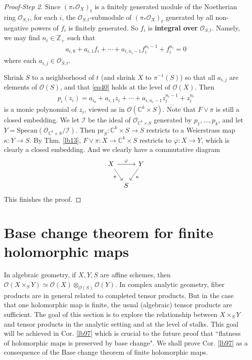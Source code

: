 \documentclass[12pt,b5paper,notitlepage]{report}
\theoremstyle{definition}
\theoremstyle{plain}
\newcommand{\mc}{\mathcal}
\newcommand{\scr}{\mathscr}
\newcommand{\Cbb}{\mathbb C}
\newcommand{\Zbb}{\mathbb Z}
\newcommand{\pr}{\mathrm {pr}}
\newcommand{\Specan}{\mathrm{Specan}}
\numberwithin{equation}{section}
\begin{document}
\begin{proof}[Proof-Step 2]
Since $(\pi_*\scr O_X)_t$ is a finitely generated module of the Noetherian ring $\scr O_{S,t}$, for each $i$, the $\scr O_{S,t}$-submodule of $(\pi_*\scr O_X)_t$ generated by all non-negative powers of $f_i$ is finitely generated. So $f_i$ is \textbf{integral over} $\scr O_{S,t}$.  Namely, we may find $n_i\in\Zbb_+$ such that
\begin{align}
a_{i,0}+a_{i,1}f_i+\cdots+a_{i,n_i-1}f_i^{n_i-1}+f_i^{n_i}=0 \label{eq40}
\end{align}
where each $a_{i,j}\in\scr O_{S,t}$. 

Shrink $S$ to a neighborhood of $t$ (and shrink $X$ to $\pi^{-1}(S)$) so that all $a_{i,j}$ are elements of $\scr O(S)$, and that \eqref{eq40} holds at the level of $\scr O(X)$. Then
\begin{align*}
p_i(z_i)=a_{i_0}+a_{i,1}z_i+\cdots+a_{i,n_i-1}z_i^{n_i-1}+z_i^{n_i}
\end{align*}
is a monic polynomial of $z_i$, viewed as in $\scr O(\Cbb^k\times S)$. Note that $F\vee\pi$ is still a closed embedding. We let $\mc I$ be the ideal of $\scr O_{\Cbb^k\times S}$ generated by $p_1,\dots,p_k$, and let $Y=\Specan(\scr O_{\Cbb^k\times S}/\mc I)$. Then $\pr_S:\Cbb^k\times S\rightarrow S$ restricts to a Weierstrass map $\kappa:Y\rightarrow S$. By Thm. \ref{lb13}, $F\vee\pi:X\rightarrow\Cbb^k\times S$ restricts to $\varphi:X\rightarrow Y$, which is clearly a closed embedding. And we clearly have a commutative diagram
\begin{equation*}
\begin{tikzcd}[column sep=tiny]
X \arrow[rd,"\pi"'] \arrow[rr,"\varphi"] &   & Y \arrow[ld,"\kappa"] \\
                        & S &             
\end{tikzcd}
\end{equation*}
This finishes the proof.
\end{proof}








\section{Base change theorem for finite holomorphic maps}



In algebraic geometry, if $X,Y,S$ are affine schemes, then $\scr O(X\times_SY)\simeq\scr O(X)\otimes_{\scr O(S)}\scr O(Y)$. In complex analytic geometry, fiber products are in general related to completed tensor products. But in the case that one holomorphic map is finite, the usual (algebraic) tensor products are sufficient. The goal of this section is to explore the relationship between $X\times_SY$ and tensor products in the analytic setting and at the level of stalks. This goal will be achieved in Cor. \ref{lb97} which is crucial to the future proof that ``flatness of holomorphic maps is preserved by base change". We shall prove Cor. \ref{lb97} as a consequence of the Base change theorem of finite holomorphic maps.
\end{document}

